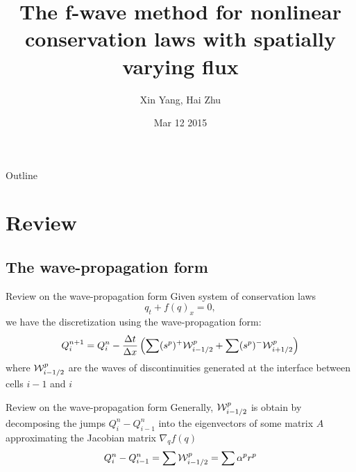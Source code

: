 \documentclass{beamer}
\title%
{The f-wave method for nonlinear conservation laws with spatially varying flux}
\author%
{Xin Yang, Hai Zhu}
\institute[University of Washington] %
{
  Course project for Amath 574\\
  Department of Applied Mathematics\\
  University of Washington
}
\date[03/12/2015] %
{Mar 12 2015}
\begin{document}
\begin{frame}
  \titlepage
\end{frame}

\begin{frame}{Outline}
  \tableofcontents
\end{frame}





\section{Review}
\subsection{The wave-propagation form}
\begin{frame}{Review on the wave-propagation form}
Given system of conservation laws
\[
q_t+f(q)_x=0,
\]
we have the discretization using the wave-propagation form: 
\[
Q^{n+1}_i=Q^{n}_i-\frac{\Delta t}{\Delta x}\left(\sum (s^p)^+{\cal W}_{i-1/2}^p+\sum (s^p)^-{\cal W}_{i+1/2}^p\right)
\]
where ${\cal W}^p_{i-1/2}$ are the waves of discontinuities generated at the interface between cells $i-1$ and $i$ 
\end{frame}
\begin{frame}{Review on the wave-propagation form}
Generally, ${\cal W}^p_{i-1/2}$ is obtain by decomposing the jumps $Q_i^n-Q_{i-1}^n$ into the eigenvectors of some matrix $A$ approximating the Jacobian matrix $ \nabla_q f(q) $
\[
Q_i^n-Q_{i-1}^n=\sum {\cal W}^p_{i-1/2}=\sum \alpha^p r^p 
\]
\end{frame}
\end{document}

